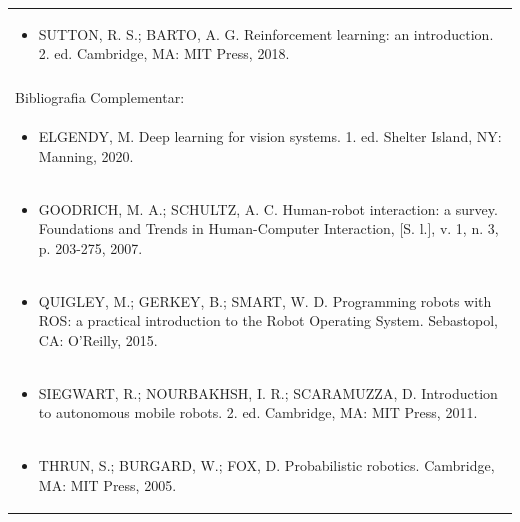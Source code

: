 \documentclass[11pt]{article}
\begin{document}
\begin{center}
\begin{longtable}{|p{4cm}|p{4cm}|p{4cm}|p{4cm}|}
\multicolumn{4}{|p{\dimexpr 16cm + 6\tabcolsep\relax}|}{\begin{itemize}\item SUTTON, R. S.; BARTO, A. G. Reinforcement learning: an introduction. 2. ed. Cambridge, MA: MIT Press, 2018.\end{itemize}}\\
\multicolumn{4}{|p{16cm}|}{}\\
\hline
\multicolumn{4}{|p{16cm}|}{Bibliografia Complementar:}\\*
\multicolumn{4}{|p{\dimexpr 16cm + 6\tabcolsep\relax}|}{\begin{itemize}\item ELGENDY, M. Deep learning for vision systems. 1. ed. Shelter Island, NY: Manning, 2020.\end{itemize}}\\
\multicolumn{4}{|p{\dimexpr 16cm + 6\tabcolsep\relax}|}{\begin{itemize}\item GOODRICH, M. A.; SCHULTZ, A. C. Human-robot interaction: a survey. Foundations and Trends in Human-Computer Interaction, [S. l.], v. 1, n. 3, p. 203-275, 2007.\end{itemize}}\\
\multicolumn{4}{|p{\dimexpr 16cm + 6\tabcolsep\relax}|}{\begin{itemize}\item QUIGLEY, M.; GERKEY, B.; SMART, W. D. Programming robots with ROS: a practical introduction to the Robot Operating System. Sebastopol, CA: O'Reilly, 2015.\end{itemize}}\\
\multicolumn{4}{|p{\dimexpr 16cm + 6\tabcolsep\relax}|}{\begin{itemize}\item SIEGWART, R.; NOURBAKHSH, I. R.; SCARAMUZZA, D. Introduction to autonomous mobile robots. 2. ed. Cambridge, MA: MIT Press, 2011.\end{itemize}}\\
\multicolumn{4}{|p{\dimexpr 16cm + 6\tabcolsep\relax}|}{\begin{itemize}\item THRUN, S.; BURGARD, W.; FOX, D. Probabilistic robotics. Cambridge, MA: MIT Press, 2005.\end{itemize}}\\
\hline
\end{longtable}
\end{center}
\end{document}
